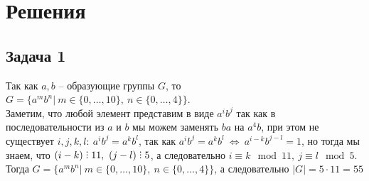 
\newpage
\section*{Решения}
\subsection*{Задача 1}
	Так как $a,b$ -- образующие группы $G$, то $G = \{a^{m}b^{n}|\ m \in \{0, \ldots, 10\},\ n \in \{0,\ldots,4\}\}$.\\
	Заметим, что любой элемент представим в виде $a^{i}b^{j}$ так как в последовательности из $a$ и $b$ мы можем заменять $ba$ на $a^4 b$, при этом не существует $i,j,k,l:\ a^{i}b^{j} = a^{k}b^{l}$, так как $a^{i}b^{j} = a^{k}b^{l}\ \Leftrightarrow\ a^{i-k}b^{j-l} = 1$, но тогда мы знаем, что $(i-k) \divby 11,\ (j-l) \divby 5$, а следовательно $i \equiv k \mod 11,\ j \equiv l \mod 5$.\\
	Тогда $G = \{a^{m}b^{n}|\ m \in \{0, \ldots, 10\},\ n \in \{0,\ldots,4\}\}$, а следовательно $|G| = 5 \cdot 11 = 55$
	
